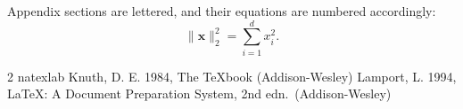 \documentclass[10pt,a4paper]{article}
\begin{document}
Appendix sections are lettered, and their equations are numbered accordingly:
\begin{equation}
  \lVert \mathbf{x} \rVert_2^2 = \sum_{i=1}^{d} x_i^2 .
\end{equation}


\begin{thebibliography}{2}
\expandafter\ifx\csname natexlab\endcsname\relax\def\natexlab#1{#1}\fi
{}
Knuth, D. E. 1984, The \TeX book (Addison-Wesley)
Lamport, L. 1994, \LaTeX: A Document Preparation System, 2nd edn.\ (Addison-Wesley)
\end{thebibliography}
% 
\end{document}
